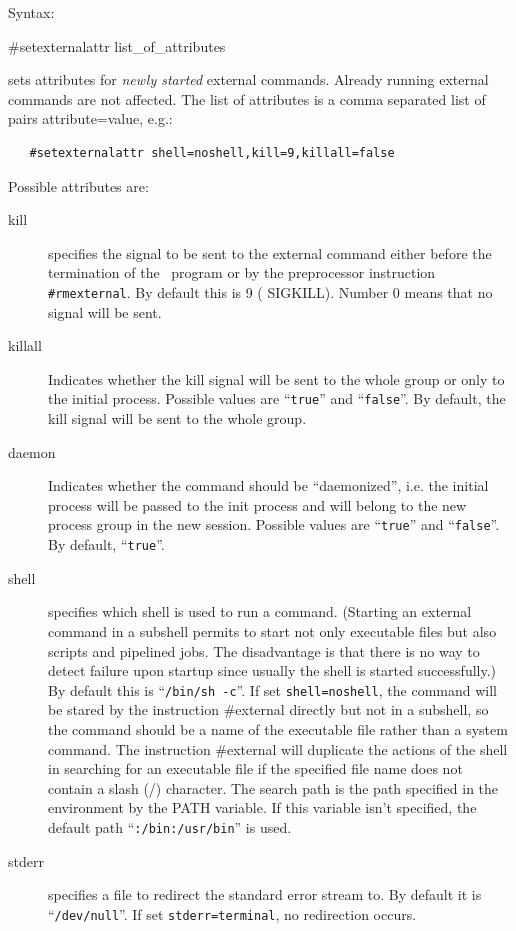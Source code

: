 \noindent Syntax:

\#setexternalattr list\_of\_attributes

\noindent sets attributes for {\em newly started} 
external commands. Already running external commands are not affected. The 
list of attributes is a comma separated list of pairs attribute=value, 
e.g.:
\begin{verbatim}
   #setexternalattr shell=noshell,kill=9,killall=false
\end{verbatim}
Possible attributes are:
\begin{description}
\item[kill]
specifies the signal to be sent to the external command 
either before the termination of the \FORM\ program or by the preprocessor 
instruction \verb|#rmexternal|. By default this is 9 (
SIGKILL). Number 0 means that no signal will be sent.
\item[killall] Indicates whether the kill signal will be sent to the whole 
group or only to the initial process. Possible values are ``\verb|true|'' 
and ``\verb|false|''. By default, the kill signal will be sent to the
whole group.
\item[daemon]
Indicates whether the command should be ``daemonized'', i.e. 
the initial process will be passed to the init process and will belong
to the new process group in the new session.  
Possible values are ``\verb|true|'' and ``\verb|false|''. By default, 
``\verb|true|''.
\item[shell]
specifies which shell is used to run a
command. (Starting an external command in a subshell permits to
start not only executable files but also scripts and 
pipelined jobs. The disadvantage is that there is no 
way to detect failure upon startup since usually the shell is started 
successfully.) By default this is ``\verb|/bin/sh -c|''.  If set 
\verb|shell=noshell|, the command will be stared by the instruction 
\#external directly but not in a subshell, so the command 
should be a name of the executable file rather than a system command. The 
instruction \#external will duplicate the actions of the shell in searching 
for an executable file if the specified file name does not contain a slash 
(/) character.  The search path is the path specified in the environment by 
the PATH variable.  If this variable isn't specified, the 
default path ``\verb|:/bin:/usr/bin|''
is used.
\item[stderr]
specifies a file to redirect the standard error 
stream to. By default it is ``\verb|/dev/null|''. If set 
\verb|stderr=terminal|, no redirection occurs.
\end{description}
